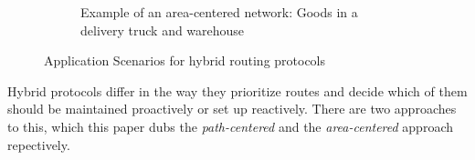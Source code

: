 \documentclass[a4paper,10pt]{scrartcl}
\begin{document}
\begin{figure}
\begin{subfigure}[b]{0.5\textwidth}
                \caption{Example of an area-centered network: Goods in a delivery truck and warehouse}
                \label{fig:ac_img}
        \end{subfigure}
        \caption[swdfghjkl]{Application Scenarios for hybrid routing protocols\footnotemark}
        \label{fig:scope}
\end{figure}

Hybrid protocols differ in the way they prioritize routes and decide which of them should be maintained proactively or set up reactively. There are two approaches to this, which this paper dubs the \emph{path-centered} and the \emph{area-centered} approach repectively.\\
\end{document}
